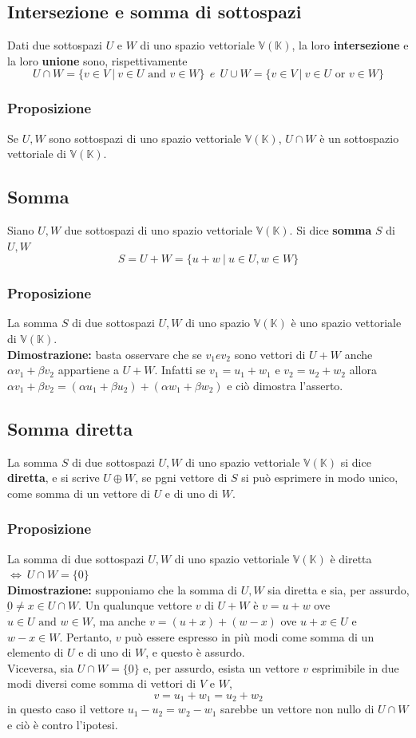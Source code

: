 \documentclass{article}
\newcommand{\V}{\mathbb{V} (\mathbb{K})}
\newcommand{\ah}{\alpha}
\newcommand{\bh}{\beta}
\begin{document}
\subsection{Intersezione e somma di sottospazi}
Dati due sottospazi $U$ e $W$ di uno spazio vettoriale $\V$, la loro
\textbf{intersezione} e la loro \textbf{unione} sono, rispettivamente
\[
    U \cap W = \{v\in V \ | \ v\in U \text{ and } v\in W  \} \ \ e \ \ U \cup W = \{v\in V \ | \ v\in U \text{ or } v\in W  \}
\]

\subsubsection{Proposizione}
Se $U, W$ sono sottospazi di uno spazio vettoriale $\V$, $U\cap W$ è un
sottospazio vettoriale di $\V$.

\subsection{Somma}
Siano $U, W$ due sottospazi di uno spazio vettoriale $\V$. Si dice
\textbf{somma} $S$ di $U, W$
\[
    S = U + W = \{u+w \ | \ u \in U,w\in W\}
\]
\subsubsection{Proposizione}
La somma $S$ di due sottospazi $U, W$ di uno spazio $\V$ è uno spazio
vettoriale di $\V$.\\ \textbf{Dimostrazione:} basta osservare che se $v_1 e
    v_2$ sono vettori di $U+W$ anche $\ah v_1+\bh v_2$ appartiene a $U+W$. Infatti
se $v_1 = u_1+w_1$ e $v_2 = u_2 + w_2$ allora $\ah v_1 + \bh v_2 = (\ah u_1 +
    \bh u_2)+(\ah w_1 + \bh w_2)$ e ciò dimostra l'asserto.

\subsection{Somma diretta}
La somma $S$ di due sottospazi $U,W$ di uno spazio vettoriale $\V$ si dice
\textbf{diretta}, e si scrive $U\oplus W$, se pgni vettore di $S$ si può
esprimere in modo unico, come somma di un vettore di $U$ e di uno di $W$.

\subsubsection{Proposizione}
La somma di due sottospazi $U, W$ di uno spazio vettoriale $\V$ è diretta $\iff
    \ U \cap W = \{0\}$ \\ \textbf{Dimostrazione:} supponiamo che la somma di $U,W$
sia diretta e sia, per assurdo, $\underbar{0} \ne x\in U\cap W$. Un qualunque
vettore $v$ di $U+W$ è $v=u+w$ ove $u\in U \text{ and } w\in W$, ma anche
$v=(u+x)+(w-x)$ ove $u+x\in U$ e $w-x\in W$. Pertanto, $v$ può essere espresso
in più modi come somma di un elemento di $U$ e di uno di $W$, e questo è
assurdo.\\ Viceversa, sia $U\cap W = \{\underbar{0}\}$ e, per assurdo, esista
un vettore $v$ esprimibile in due modi diversi come somma di vettori di $V$ e
$W$,
\[
    v=u_1+w_1=u_2+w_2
\]
in questo caso il vettore $u_1-u_2=w_2-w_1$ sarebbe un vettore non nullo di
$U\cap W$ e ciò è contro l'ipotesi.
\end{document}
